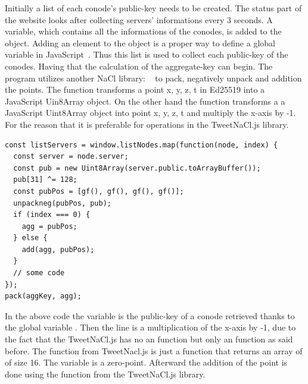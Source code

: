 \documentclass[11pt, a4paper, twoside, openright, openany]{article} %
\begin{document}
Initially a list of each conode's public-key needs to be created. The status part
of the website looks after collecting servers' informations every 3 seconds. A variable,
which contains all the informations of the conodes, is added to the  object.
Adding an element to the  object is a proper way to define a global variable
in JavaScript~\cite{globalVariable}. Thus this list is used to collect each public-key
of the conodes. Having that the calculation of the aggregate-key can begin.
The program utilizes another NaCl library: ~\cite{tweetNacl} to
pack, negatively unpack and addition the points. The function  transforms a point x, y, z, t in Ed25519
into a JavaScript Uin8Array object. On the other hand the function 
transforms a a JavaScript Uint8Array object into point x, y, z, t and multiply
the x-axis by -1. For the reason that it is preferable for operations in the TweetNaCl.js library.
\bigbreak

\begin{lstlisting}[caption={Extract of the code calculating the aggregate-key}, captionpos=b]
const listServers = window.listNodes.map(function(node, index) {
  const server = node.server;
  const pub = new Uint8Array(server.public.toArrayBuffer());
  pub[31] ^= 128;
  const pubPos = [gf(), gf(), gf(), gf()];
  unpackneg(pubPos, pub);
  if (index === 0) {
    agg = pubPos;
  } else {
    add(agg, pubPos);
  }
  // some code
});
pack(aggKey, agg);
\end{lstlisting}

In the above code the variable  is the public-key of a conode retrieved thanks to
the global variable .
\newline
Then the line  is
a multiplication of the x-axis by -1, due to the fact that the TweetNaCl.js has no
an  function but only an  function as said before.
\newline
The function  from TweetNacl.js is just a function that returns an array
of  of size 16. The variable  is a zero-point.
\newline
Afterward the addition of the point is done using the  function from
the TweetNaCl.js library.
\bigbreak
\end{document}
